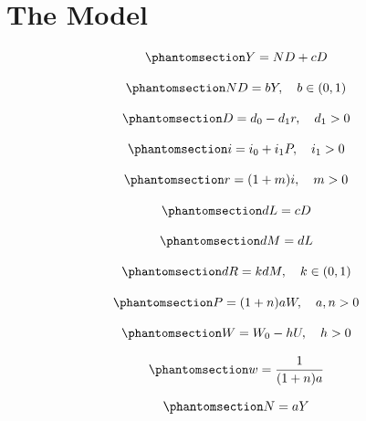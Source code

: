 \documentclass[
  letterpaper,
  DIV=11,
  numbers=noendperiod]{scrreprt}
\begin{document}
\section{The Model}\label{the-model-3}

\begin{equation}\phantomsection\label{eq-Y-PK}{
Y=ND+cD
}\end{equation}

\begin{equation}\phantomsection\label{eq-ND-PK}{
ND=bY, \quad b \in (0,1)
}\end{equation}

\begin{equation}\phantomsection\label{eq-D-PK}{
D= d_0 - d_1r, \quad d_1 > 0
}\end{equation}

\begin{equation}\phantomsection\label{eq-i-PK}{
i=i_0 + i_1P, \quad i_1 > 0
}\end{equation}

\begin{equation}\phantomsection\label{eq-r-PK}{
r=(1+m)i, \quad m > 0
}\end{equation}

\begin{equation}\phantomsection\label{eq-dL-PK}{
dL=cD
}\end{equation}

\begin{equation}\phantomsection\label{eq-dM-PK}{
dM=dL
}\end{equation}

\begin{equation}\phantomsection\label{eq-dR-PK}{
dR=kdM, \quad k \in (0,1)
}\end{equation}

\begin{equation}\phantomsection\label{eq-P-PK}{
P=(1+n)aW, \quad a,n > 0
}\end{equation}

\begin{equation}\phantomsection\label{eq-W-PK}{
W=W_0 - hU, \quad h > 0
}\end{equation}

\begin{equation}\phantomsection\label{eq-w-PK}{
w=\frac{1}{(1+n)a}
}\end{equation}

\begin{equation}\phantomsection\label{eq-N-PK}{
N=aY
}\end{equation}
\end{document}
